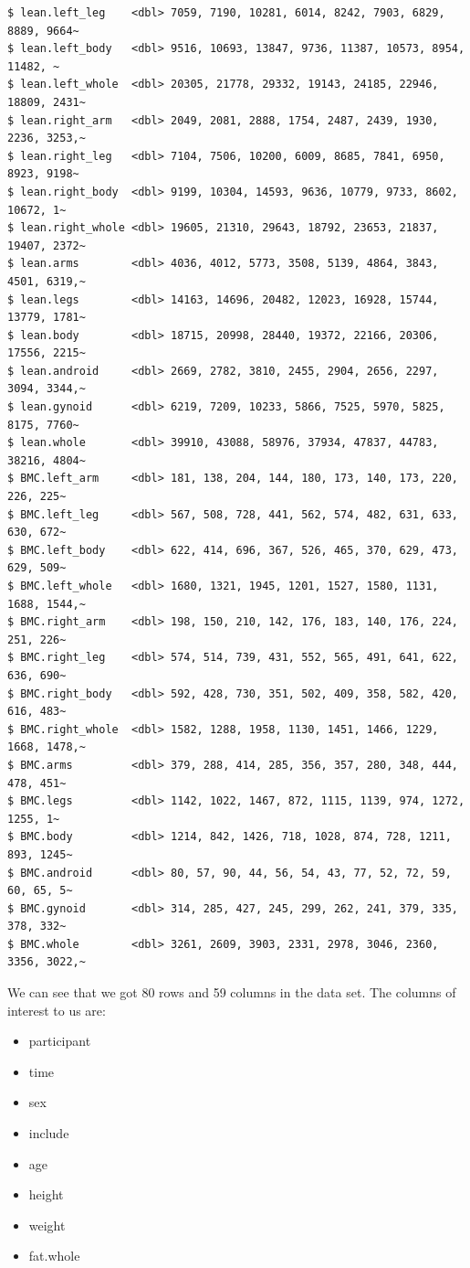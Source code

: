 \documentclass[
  11pt,
  letterpaper,
]{scrbook}
\providecommand{\tightlist}{%
  \setlength{\itemsep}{0pt}\setlength{\parskip}{0pt}}\usepackage{longtable,booktabs,array}
\begin{document}
\begin{verbatim}
$ lean.left_leg    <dbl> 7059, 7190, 10281, 6014, 8242, 7903, 6829, 8889, 9664~
$ lean.left_body   <dbl> 9516, 10693, 13847, 9736, 11387, 10573, 8954, 11482, ~
$ lean.left_whole  <dbl> 20305, 21778, 29332, 19143, 24185, 22946, 18809, 2431~
$ lean.right_arm   <dbl> 2049, 2081, 2888, 1754, 2487, 2439, 1930, 2236, 3253,~
$ lean.right_leg   <dbl> 7104, 7506, 10200, 6009, 8685, 7841, 6950, 8923, 9198~
$ lean.right_body  <dbl> 9199, 10304, 14593, 9636, 10779, 9733, 8602, 10672, 1~
$ lean.right_whole <dbl> 19605, 21310, 29643, 18792, 23653, 21837, 19407, 2372~
$ lean.arms        <dbl> 4036, 4012, 5773, 3508, 5139, 4864, 3843, 4501, 6319,~
$ lean.legs        <dbl> 14163, 14696, 20482, 12023, 16928, 15744, 13779, 1781~
$ lean.body        <dbl> 18715, 20998, 28440, 19372, 22166, 20306, 17556, 2215~
$ lean.android     <dbl> 2669, 2782, 3810, 2455, 2904, 2656, 2297, 3094, 3344,~
$ lean.gynoid      <dbl> 6219, 7209, 10233, 5866, 7525, 5970, 5825, 8175, 7760~
$ lean.whole       <dbl> 39910, 43088, 58976, 37934, 47837, 44783, 38216, 4804~
$ BMC.left_arm     <dbl> 181, 138, 204, 144, 180, 173, 140, 173, 220, 226, 225~
$ BMC.left_leg     <dbl> 567, 508, 728, 441, 562, 574, 482, 631, 633, 630, 672~
$ BMC.left_body    <dbl> 622, 414, 696, 367, 526, 465, 370, 629, 473, 629, 509~
$ BMC.left_whole   <dbl> 1680, 1321, 1945, 1201, 1527, 1580, 1131, 1688, 1544,~
$ BMC.right_arm    <dbl> 198, 150, 210, 142, 176, 183, 140, 176, 224, 251, 226~
$ BMC.right_leg    <dbl> 574, 514, 739, 431, 552, 565, 491, 641, 622, 636, 690~
$ BMC.right_body   <dbl> 592, 428, 730, 351, 502, 409, 358, 582, 420, 616, 483~
$ BMC.right_whole  <dbl> 1582, 1288, 1958, 1130, 1451, 1466, 1229, 1668, 1478,~
$ BMC.arms         <dbl> 379, 288, 414, 285, 356, 357, 280, 348, 444, 478, 451~
$ BMC.legs         <dbl> 1142, 1022, 1467, 872, 1115, 1139, 974, 1272, 1255, 1~
$ BMC.body         <dbl> 1214, 842, 1426, 718, 1028, 874, 728, 1211, 893, 1245~
$ BMC.android      <dbl> 80, 57, 90, 44, 56, 54, 43, 77, 52, 72, 59, 60, 65, 5~
$ BMC.gynoid       <dbl> 314, 285, 427, 245, 299, 262, 241, 379, 335, 378, 332~
$ BMC.whole        <dbl> 3261, 2609, 3903, 2331, 2978, 3046, 2360, 3356, 3022,~
\end{verbatim}

We can see that we got 80 rows and 59 columns in the data set. The
columns of interest to us are:

\begin{itemize}
\tightlist
\item
  participant
\item
  time
\item
  sex
\item
  include
\item
  age
\item
  height
\item
  weight
\item
  fat.whole
\end{itemize}
\end{document}

